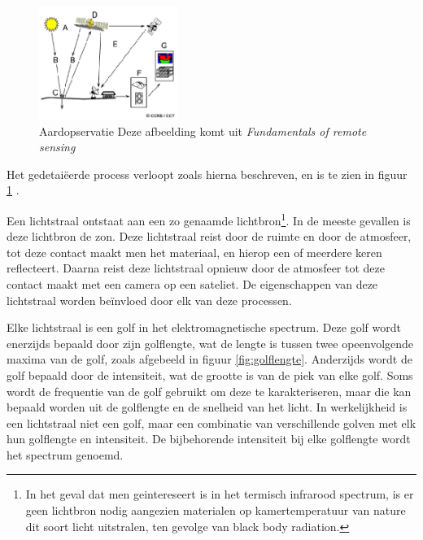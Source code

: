 \documentclass[12pt]{report}
\begin{document}
\begin{figure}
\includegraphics[width=0.4\textwidth]{rs.PNG}
\caption{Aardopservatie \label{fig:rs} Deze afbeelding komt uit \textit{Fundamentals of remote sensing\cite{fun}}}
\end{figure}


Het gedetai\"eerde process verloopt zoals hierna beschreven\cite{fun}, en is te zien in figuur \ref{fig:rs} .

Een lichtstraal ontstaat aan een zo genaamde lichtbron\footnote{In het geval dat men geintereseert is in het termisch infrarood spectrum, is er geen lichtbron nodig aangezien materialen op kamertemperatuur van nature dit soort licht uitstralen, ten gevolge van black body radiation.}. In de meeste gevallen is deze lichtbron de zon. Deze lichtstraal reist door de ruimte en door de atmosfeer, tot deze contact maakt men het materiaal, en hierop een of meerdere keren reflecteert. Daarna reist deze lichtstraal opnieuw door de atmosfeer tot deze contact maakt met een camera op een sateliet. De eigenschappen van deze lichtstraal worden be\"invloed door elk van deze processen.





Elke lichtstraal is een golf in het elektromagnetische spectrum. Deze golf wordt enerzijds bepaald door zijn golflengte, wat de lengte is tussen twee opeenvolgende maxima van de golf, zoals afgebeeld in figuur \ref{fig:golflengte}. Anderzijds wordt de golf bepaald door de intensiteit, wat de grootte is van de piek van elke golf. Soms wordt de frequentie van de golf gebruikt om deze te karakteriseren, maar die kan bepaald worden uit de golflengte en de snelheid van het licht. In werkelijkheid is een lichtstraal niet een golf, maar een combinatie van verschillende golven met elk hun golflengte en intensiteit. De bijbehorende intensiteit bij elke golflengte wordt het spectrum genoemd.
\end{document}
